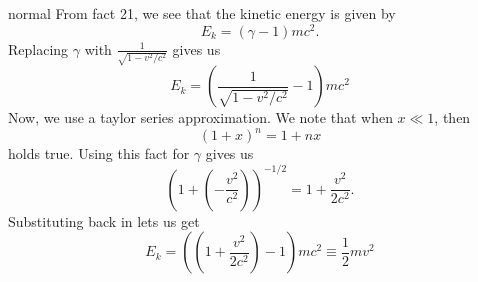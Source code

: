 \begin{solution}{normal}
From fact 21, we see that the kinetic energy is given by 
\[E_k = (\gamma - 1)mc^2.\]
Replacing $\gamma$ with $\frac{1}{\sqrt{1-v^2/c^2}}$ gives us 
\[E_k = \left(\frac{1}{\sqrt{1-v^2/c^2}} - 1\right)mc^2\]
Now, we use a taylor series approximation. We note that when $x\ll 1$, then 
\[(1 + x)^n = 1+nx\]
holds true. Using this fact for $\gamma$ gives us 
\[\left(1+\left(-\frac{v^2}{c^2}\right)\right)^{-1/2} = 1 + \frac{v^2}{2c^2}.\]
Substituting back in lets us get 
\[E_k = \left(\left(1 + \frac{v^2}{2c^2}\right) - 1\right)mc^2 \equiv \frac{1}{2}mv^2\]

\end{solution}